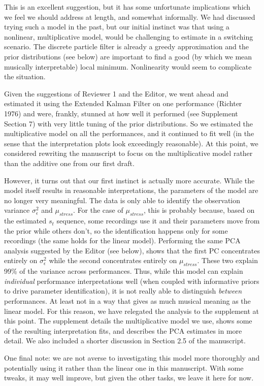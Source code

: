 \documentclass[12pt]{article}
\newenvironment{resp}{\color{cobalt}}{}
\begin{document}
\begin{resp}
  This is an excellent suggestion, but it has some unfortunate implications which we feel we should address at length, and somewhat informally. We had discussed trying such a model in the past, but our initial instinct was that using a nonlinear, multiplicative model, would be challenging to estimate in a switching scenario. The discrete particle filter is already a greedy approximation and the prior distributions (see below) are important to find a good (by which we mean musically interpretable) local minimum. Nonlinearity would seem to complicate the situation.

  Given the suggestions of Reviewer 1 and the Editor, we went ahead and estimated it using the Extended Kalman Filter on one performance (Richter 1976) and were, frankly, stunned at how well it performed (see Supplement Section 7) with very little tuning of the prior distributions. So we estimated the multiplicative model on all the performances, and it continued to fit well (in the sense that the interpretation plots look exceedingly reasonable). At this point, we considered rewriting the manuscript to focus on the multiplicative model rather than the additive one from our first draft.

  However, it turns out that our first instinct is actually more accurate. While the model itself results in reasonable interpretations, the parameters of the model are no longer very meaningful. The data is only able to identify the observation variance $\sigma^2_\epsilon$ and $\mu_{stress}$. For the case of $\mu_{stress}$, this is probably because, based on the estimated $s_t$ sequence, some recordings use it and their parameters move from the prior while others don't, so the identification happens only for some recordings (the same holds for the linear model). Performing the same PCA analysis suggested by the Editor (see below), shows that the first PC concentrates entirely on $\sigma^2_\epsilon$ while the second concentrates entirely on $\mu_{stress}$. These two explain 99\% of the variance across performances. Thus, while this model can explain \emph{individual} performance interpretations well (when coupled with informative priors to drive parameter identification), it is not really able to distinguish \emph{between} performances. At least not in a way that gives as much musical meaning as the linear model. For this reason, we have relegated the analysis to the supplement at this point. The supplement details the multiplicative model we use, shows some of the resulting interpretation fits, and describes the PCA estimates in more detail. We also included a shorter discussion in Section 2.5 of the manuscript.

  One final note: we are not averse to investigating this model more thoroughly and potentially using it rather than the linear one in this manuscript. With some tweaks, it may well improve, but given the other tasks, we leave it here for now.
\end{resp}
\end{document}
